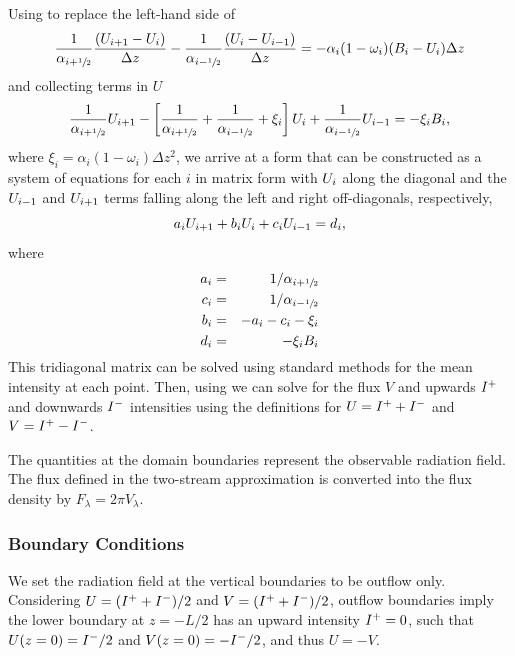 Using  to replace the left-hand side of 
\begin{equation}
      \frac{1}{\alpha_{i+\sfrac{1}{2}}} \frac{(U_{i+1} - U_i)}{\Delta z} 
    - \frac{1}{\alpha_{i-\sfrac{1}{2}}} \frac{(U_i - U_{i-1})}{\Delta z}  
    = - \alpha_i (1 - \omega_i)(B_i - U_i) \Delta z
\end{equation}
and collecting terms in $U$
\begin{equation}
    \frac{1}{\alpha_{i+\sfrac{1}{2}}} U_{i+1} - \left[ \frac{1}{\alpha_{i+\sfrac{1}{2}}}+ \frac{1}{\alpha_{i-\sfrac{1}{2}}} + \xi_i  \right] U_i + \frac{1}{\alpha_{i-\sfrac{1}{2}}} U_{i-1}  = - \xi_i B_i,
\end{equation}
where $\xi_i = \alpha_i (1 - \omega_i) \Delta z^2$, we arrive at a form that can be constructed as a system of equations for each $i$ in matrix form with $U_i$ along the diagonal and the $U_{i-1}$ and $U_{i+1}$ terms falling along the left and right off-diagonals, respectively, 
\begin{equation}
    a_i U_{i+1} + b_i U_i + c_i U_{i-1} = d_i, \label{eqn:system-in-U_i}
\end{equation}
where
\begin{eqnarray}
    a_i &=& 1/\alpha_{i+\sfrac{1}{2}} \\
    c_i &=& 1/\alpha_{i-\sfrac{1}{2}} \\
    b_i &=& -a_i - c_i - \xi_i \\
    d_i &=& - \xi_i B_i
\end{eqnarray}
This tridiagonal matrix can be solved using standard methods for the mean intensity at each point.
Then, using  we can solve for the flux $V$ and upwards $I^+$ and downwards $I^-$ intensities using the definitions for $U = I^+ + I^-$ and $V = I^+ - I^-$.

The quantities at the domain boundaries represent the observable radiation field.
The flux defined in the two-stream approximation is converted into the flux density by $F_\lambda = 2 \pi V_\lambda$.

\subsubsection{Boundary Conditions}
We set the radiation field at the vertical boundaries to be outflow only.
Considering $U = (I^+ + I^-) / 2$ and $V = (I^+ + I^-) / 2$, outflow boundaries imply the lower boundary at $z=-L/2$ has an upward intensity $I^+=0$, such that $U(z=0) = I^-/2$ and $V(z=0)=-I^-/2$, and thus $U=-V$.

